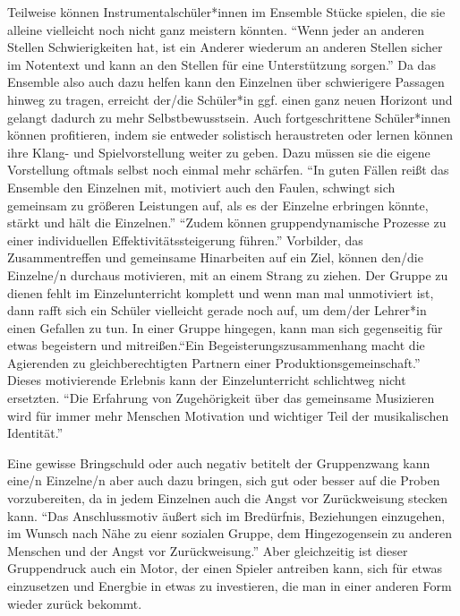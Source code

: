 Teilweise können Instrumentalschüler*innen im Ensemble Stücke spielen, die sie
alleine vielleicht noch nicht ganz meistern könnten. \enquote{Wenn jeder an
anderen Stellen Schwierigkeiten hat, ist ein Anderer wiederum an anderen Stellen
sicher im Notentext und kann an den Stellen für eine Unterstützung sorgen.}
\autocite[32]{losert:die_kunst_zu_unterrichten}
Da das Ensemble also auch dazu helfen kann den Einzelnen über schwierigere
Passagen hinweg zu tragen, erreicht der/die Schüler*in ggf. einen ganz neuen
Horizont und gelangt dadurch zu mehr Selbstbewusstsein. Auch fortgeschrittene
Schüler*innen können profitieren, indem sie entweder solistisch heraustreten
oder lernen können ihre Klang- und Spielvorstellung weiter zu geben. Dazu müssen
sie die eigene Vorstellung oftmals selbst noch einmal mehr schärfen. \enquote{In
guten Fällen reißt das Ensemble den Einzelnen mit, motiviert auch den Faulen,
schwingt sich gemeinsam zu größeren Leistungen auf, als es der Einzelne
erbringen könnte, stärkt und hält die Einzelnen.}
\autocite[94]{mitzscherlich:musikpsychologie} \enquote{Zudem können
gruppendynamische Prozesse zu einer individuellen Effektivitätssteigerung
führen.} \autocite{losert:die_kunst_zu_unterrichten} Vorbilder, das
Zusammentreffen und gemeinsame Hinarbeiten auf ein Ziel, können den/die
Einzelne/n durchaus motivieren, mit an einem Strang zu ziehen. Der Gruppe zu
dienen fehlt im Einzelunterricht komplett und wenn man mal unmotiviert ist, dann
rafft sich ein Schüler vielleicht gerade noch auf, um dem/der Lehrer*in einen
Gefallen zu tun. In einer Gruppe hingegen, kann man sich gegenseitig für etwas
begeistern und mitreißen.\enquote{Ein Begeisterungszusammenhang macht die
Agierenden zu gleichberechtigten Partnern einer Produktionsgemeinschaft.}
\autocite[198]{busch:grundwissen_instrumentalpaedagogik} Dieses motivierende
Erlebnis kann der Einzelunterricht schlichtweg nicht ersetzten. \enquote{Die
Erfahrung von Zugehörigkeit über das gemeinsame Musizieren wird für immer mehr
Menschen Motivation und wichtiger Teil der musikalischen Identität.}
\autocite[123]{mitzscherlich:musikpsychologie}

Eine gewisse Bringschuld oder
auch negativ betitelt der Gruppenzwang kann eine/n Einzelne/n aber auch dazu
bringen, sich gut oder besser auf die Proben vorzubereiten, da in jedem
Einzelnen auch die Angst vor Zurückweisung stecken kann. \enquote{Das
Anschlussmotiv äußert sich im Bredürfnis, Beziehungen einzugehen, im Wunsch nach
Nähe zu eienr sozialen Gruppe, dem Hingezogensein zu anderen Menschen und der
Angst vor Zurückweisung.} \autocite[120ff]{losert:die_kunst_zu_unterrichten}
Aber gleichzeitig ist dieser Gruppendruck auch ein Motor, der einen Spieler
antreiben kann, sich für etwas einzusetzen und Energbie in etwas zu investieren,
die man in einer anderen Form wieder zurück bekommt.






